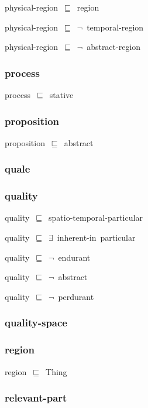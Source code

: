\documentclass{article}
\begin{document}
physical-region~\ensuremath{\sqsubseteq}~region~

physical-region~\ensuremath{\sqsubseteq}~\ensuremath{\lnot}~temporal-region

physical-region~\ensuremath{\sqsubseteq}~\ensuremath{\lnot}~abstract-region

\subsubsection*{process}

process~\ensuremath{\sqsubseteq}~stative~

\subsubsection*{proposition}

proposition~\ensuremath{\sqsubseteq}~abstract~

\subsubsection*{quale}

\subsubsection*{quality}

quality~\ensuremath{\sqsubseteq}~spatio-temporal-particular~

quality~\ensuremath{\sqsubseteq}~\ensuremath{\exists}~inherent-in~particular~

quality~\ensuremath{\sqsubseteq}~\ensuremath{\lnot}~endurant

quality~\ensuremath{\sqsubseteq}~\ensuremath{\lnot}~abstract

quality~\ensuremath{\sqsubseteq}~\ensuremath{\lnot}~perdurant

\subsubsection*{quality-space}

\subsubsection*{region}

region~\ensuremath{\sqsubseteq}~Thing~

\subsubsection*{relevant-part}
\end{document}
